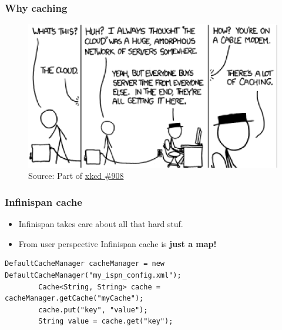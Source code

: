 \documentclass[10pt,utf8]{beamer}
\begin{document}
\begin{frame}
	\frametitle{Why caching}
	\begin{figure}
		\centering
		\includegraphics[width=12cm]{./img/xkcd_908.eps}
		\caption{\tiny{Source: Part of \href{http://xkcd.com/908/}{xkcd \#908}}}
	\end{figure}
\end{frame}

\begin{frame}[fragile]
	\frametitle{Infinispan cache}
	\begin{itemize}
		\item Infinispan takes care about all that hard stuf.
		\item From user perspective Infinispan cache is \textbf{just a map!}
	\end{itemize}
	\vspace{0.3cm}
	\begin{lstlisting}[style=Java]
		DefaultCacheManager cacheManager = new DefaultCacheManager("my_ispn_config.xml");
		Cache<String, String> cache = cacheManager.getCache("myCache");
		cache.put("key", "value");
		String value = cache.get("key");
	\end{lstlisting}
\end{frame}
\end{document}
